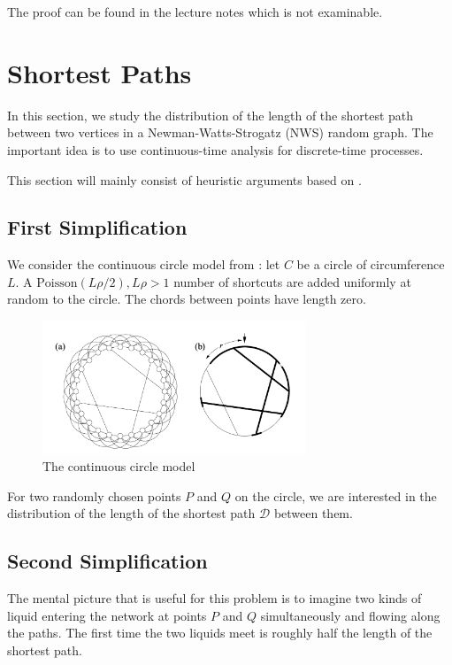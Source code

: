 \documentclass{article}
\begin{document}
The proof can be found in the lecture notes which is not examinable.

\newpage 

\section{Shortest Paths}
In this section, we study the distribution of the length of the shortest path between two vertices in a Newman-Watts-Strogatz (NWS) random graph. The important idea is to use continuous-time analysis for discrete-time processes. 

This section will mainly consist of heuristic arguments based on \citep{Reinert2001}.

\subsection{First Simplification}

We consider the continuous circle model from \citep{Newman_2000}: let $C$ be a circle of circumference $L$. A $\mathrm{Poisson}(L\rho/2), L\rho>1$ number of shortcuts are added uniformly at random to the circle. The chords between points have length zero. 

\begin{figure}[h]
    \centering
    \includegraphics[width=0.7\textwidth]{figures/newman1999.png}
    \caption{The continuous circle model \citep{Newman_2000}}
    \label{fig:newman1999}
\end{figure}

For two randomly chosen points $P$ and $Q$ on the circle, we are interested in the distribution of the length of the shortest path $\mathcal{D}$ between them.  

\subsection{Second Simplification}
The mental picture that is useful for this problem is to imagine two kinds of liquid entering the network at points $P$ and $Q$ simultaneously and flowing along the paths. The first time the two liquids meet is roughly half the length of the shortest path.  
\end{document}
